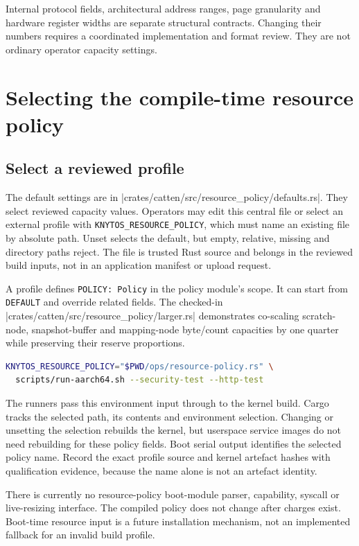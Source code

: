 Internal protocol fields, architectural address ranges, page granularity and
hardware register widths are separate structural contracts. Changing their
numbers requires a coordinated implementation and format review. They are not
ordinary operator capacity settings.

\section{Selecting the compile-time resource policy}

\subsection{Select a reviewed profile}

The default settings are in
\repofile|crates/catten/src/resource_policy/defaults.rs|. They select reviewed
capacity values. Operators may edit this central file or select an external
profile with \texttt{KNYTOS\_RESOURCE\_POLICY}, which must name an existing file
by absolute path. Unset selects the default, but empty, relative, missing and
directory paths reject. The file is trusted Rust source and belongs in the
reviewed build inputs, not in an application manifest or upload request.

A profile defines \texttt{POLICY: Policy} in the policy module's scope. It can
start from \texttt{DEFAULT} and override related fields. The checked-in
\repofile|crates/catten/src/resource_policy/larger.rs| demonstrates co-scaling
scratch-node, snapshot-buffer and mapping-node byte/count capacities by one
quarter while preserving their reserve proportions.

\begin{lstlisting}[language=bash]
KNYTOS_RESOURCE_POLICY="$PWD/ops/resource-policy.rs" \
  scripts/run-aarch64.sh --security-test --http-test
\end{lstlisting}

The runners pass this environment input through to the kernel build. Cargo
tracks the selected path, its contents and environment selection. Changing or
unsetting the selection rebuilds the kernel, but userspace service images do not
need rebuilding for these policy fields. Boot serial output identifies the
selected policy name. Record the exact profile source and kernel artefact
hashes with qualification evidence, because the name alone is not an artefact identity.

There is currently no resource-policy boot-module parser, capability, syscall
or live-resizing interface. The compiled policy does not change after charges
exist. Boot-time resource input is a future installation mechanism, not an
implemented fallback for an invalid build profile.

